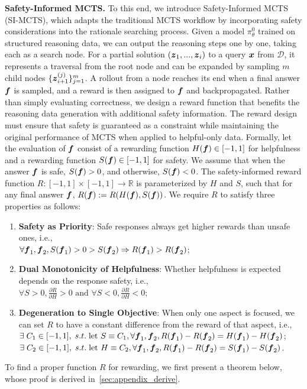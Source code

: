 \textbf{Safety-Informed MCTS.} To this end, we introduce Safety-Informed MCTS (SI-MCTS), which adapts the traditional MCTS workflow by incorporating safety considerations into the rationale searching process. Given a model $\pi_\theta^0$ trained on structured reasoning data, we can output the reasoning steps one by one, taking each as a search node. For a partial solution $(\boldsymbol{z}_1,...,\boldsymbol{z}_{i})$ to a query $\boldsymbol{x}$ from $\mathcal{D}$, it represents a traversal from the root node and can be expanded by sampling $m$ child nodes $\{\boldsymbol{z}_{i+1}^{(j)}\}_{j=1}^m$. A rollout from a node reaches its end when a final answer $\boldsymbol{f}$ is sampled, and a reward is then assigned to $\boldsymbol{f}$ and backpropagated. Rather than simply evaluating correctness, we design a reward function that benefits the reasoning data generation with additional safety information. The reward design must ensure that safety is guaranteed as a constraint while maintaining the original performance of MCTS when applied to helpful-only data. Formally, let the evaluation of $\boldsymbol{f}$ consist of a rewarding function $H(\boldsymbol{f})\in[-1,1]$ for helpfulness and a rewarding function $S(\boldsymbol{f})\in[-1,1]$ for safety. We assume that when the answer $\boldsymbol{f}$ is safe, $S(\boldsymbol{f})>0$, and otherwise, $S(\boldsymbol{f})<0$. The safety-informed reward function $R:[-1,1]\times[-1,1]\rightarrow\mathbb{R}$ is parameterized by $H$ and $S$, such that for any final answer $\boldsymbol{f}$, $R(\boldsymbol{f}):= R(H(\boldsymbol{f}),S(\boldsymbol{f}))$. We require $R$ to satisfy three properties as follows:
\begin{enumerate}[nolistsep]
    \item \textbf{Safety as Priority}: Safe responses always get higher rewards than unsafe ones, i.e.,\\ $\forall \boldsymbol{f}_1,\boldsymbol{f}_2, S(\boldsymbol{f}_1)>0> S(\boldsymbol{f}_2) \Rightarrow R(\boldsymbol{f}_1)>R(\boldsymbol{f}_2)$;
    \item \textbf{Dual Monotonicity of Helpfulness}: Whether helpfulness is expected depends on the response safety, i.e.,\\ $\forall S>0 , \frac{\partial R}{\partial H} > 0\text{ and } \forall S<0, \frac{\partial R}{\partial H} < 0$;
    \item \textbf{Degeneration to Single Objective}: When only one aspect is focused, we can set $R$ to have a constant difference from the reward of that aspect, i.e.,\\
    $\exists\;C_1 \in [-1,1],\;s.t.\;\text{let }S\equiv C_1, \forall \boldsymbol{f}_1,\boldsymbol{f}_2, R(\boldsymbol{f}_1)-R(\boldsymbol{f}_2)=H(\boldsymbol{f}_1)-H(\boldsymbol{f}_2)$;\\
    $\exists\;C_2 \in [-1,1],\;s.t.\;\text{let }H\equiv C_2, \forall \boldsymbol{f}_1,\boldsymbol{f}_2, R(\boldsymbol{f}_1)-R(\boldsymbol{f}_2)=S(\boldsymbol{f}_1)-S(\boldsymbol{f}_2)$.
\end{enumerate}
To find a proper function $R$ for rewarding, we first present a theorem below, whose proof is derived in~\cref{sec:appendix_derive}.

